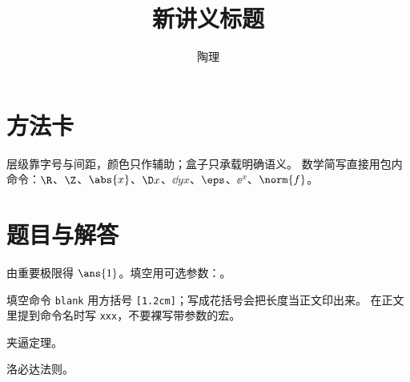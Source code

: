 \documentclass[11pt,a4paper]{ctexart}
\title{新讲义标题}
\author{陶理}
\makeatletter
\newcommand{\showtitle}{\@title}
\newcommand{\showauthor}{\@author}
\newcommand{\showdate}{\@date}
\makeatother
\begin{document}
\begin{center}
  {\LARGE\bfseries\color{tlblue}\showtitle\par}
  \vspace{0.35em}
  {\normalsize\showauthor\quad\showdate\par}
\end{center}
\vspace{-0.3em}
\noindent{\color{tlrule}\rule{\textwidth}{0.5pt}}


\section{方法卡}

\begin{keypoint}[要点盒]
层级靠字号与间距，颜色只作辅助；盒子只承载明确语义。
数学简写直接用包内命令：$\R$、$\Z$、$\abs{x}$、$\D x$、$\dd{y}{x}$、$\eps$、$\ee^{x}$、$\norm{f}$。
\end{keypoint}

\section{题目与解答}

\begin{solution}
由重要极限得 $\ans{1}$。填空用可选参数：\blank[1.2cm]。
\end{solution}

\begin{warnbox}[易错点]
填空命令 \texttt{blank} 用方括号 \texttt{[1.2cm]}；写成花括号会把长度当正文印出来。
在正文里提到命令名时写 \texttt{xxx}，不要裸写带参数的宏。
\end{warnbox}

\begin{methodbox}[一题多解]
\begin{subproblem} 夹逼定理。 \end{subproblem}
\begin{subproblem} 洛必达法则。 \end{subproblem}
\end{methodbox}
\end{document}
